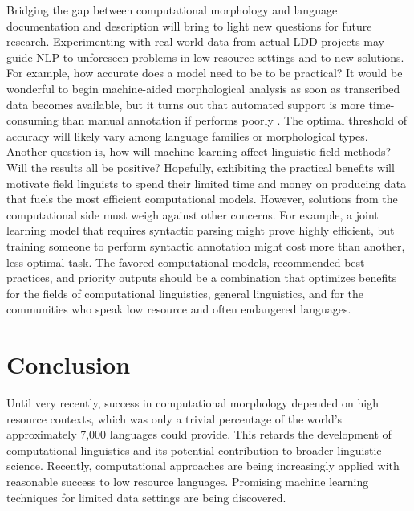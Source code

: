 \documentclass[12pt]{article}
\begin{document}
Bridging the gap between computational morphology and language documentation and description will bring to light new questions for future research. Experimenting with real world data from actual LDD projects may guide NLP to unforeseen problems in low resource settings and to new solutions. For example, how accurate does a model need to be to be practical? It would be wonderful to begin machine-aided morphological analysis as soon as transcribed data becomes available, but it turns out that automated support is more time-consuming than manual annotation if performs poorly \cite{kothur_document-level_2018,palmer_semi-automated_2009}. The optimal threshold of accuracy will likely vary among language families or morphological types. Another question is, how will machine learning affect linguistic field methods? Will the results all be positive? Hopefully, exhibiting the practical benefits will motivate field linguists to spend their limited time and money on producing data that fuels the most efficient computational models. However, solutions from the computational side must weigh against other concerns. For example, a joint learning model that requires syntactic parsing might prove highly efficient, but training someone to perform syntactic annotation might cost more than another, less optimal task. The favored computational models, recommended best practices, and priority outputs should be a combination that optimizes benefits for the fields of computational linguistics, general linguistics, and for the communities who speak low resource and often endangered languages. 

\section{Conclusion}

Until very recently, success in computational morphology depended on high resource contexts, which was only a trivial percentage of the world’s approximately 7,000 languages could provide. This retards the development of computational linguistics and its potential contribution to broader linguistic science. Recently, computational approaches are being increasingly applied with reasonable success to low resource languages. Promising machine learning techniques for limited data settings are being discovered. 
\end{document}
